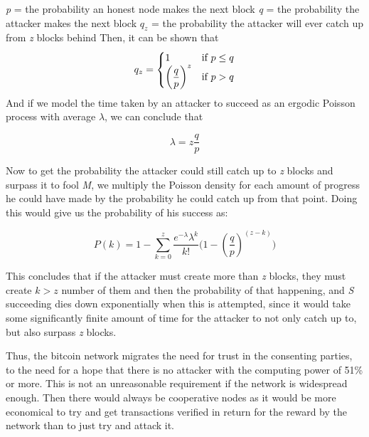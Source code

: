 \documentclass[12pt,a4paper]{report}
\begin{document}
\begin{flushleft}
\textit{p} = the probability an honest node makes the next block\newline
\textit{q} = the probability the attacker makes the next block\newline
\textit{$q_z$} = the probability the attacker will ever catch up from \textit{z} blocks behind\newline
Then, it can be shown that \newline
\begin{equation*} 
  q_z = \begin{cases}
 1  & \text{if $p \leq q$} \\
 $$\left(\dfrac{q}{p}\right)^z$$ & \text{if $p > q$}
\end{cases}
\label{eqn:simple_one} 
\end{equation*}
\newline
And if we model the time taken by an attacker to succeed as an ergodic Poisson process with average $\lambda$, we can conclude that 

\begin{equation*} 
  \lambda = z\frac{q}{p}
\end{equation*}
\newline

Now to get the probability the attacker could still catch up to \textit{z} blocks and  surpass it to fool \textit{M}, we multiply the Poisson density for each amount of progress he could have made by the probability he could catch up from that point. Doing this would give us the probability of his success as:

\begin{equation*} 
P\left( k \right) =1-\sum_{k=0}^{z} \frac{{e^{ - \lambda } \lambda ^k }}{{k!}}\Bigg(1-\left(\dfrac{q}{p}\right)^{(z-k)}\Bigg)

\end{equation*}

This concludes that if the attacker must create more than \textit{z} blocks, they must create $k>z$ number of them and then the probability of that happening, and \textit{S} succeeding dies down exponentially when this is attempted, since it would take some significantly finite amount of time for the attacker to not only catch up to, but also surpass \textit{z} blocks. 
\vspace{10mm}

Thus, the bitcoin network migrates the need for trust in the consenting parties, to the need for a hope that there is no attacker with the computing power of 51\% or more. This is not an unreasonable requirement if the network is widespread enough. Then there would always be cooperative nodes as it would be more economical to try and get transactions verified in return for the reward by the network than to just try and attack it.
\vspace{10mm}


\end{flushleft}
\end{document}
